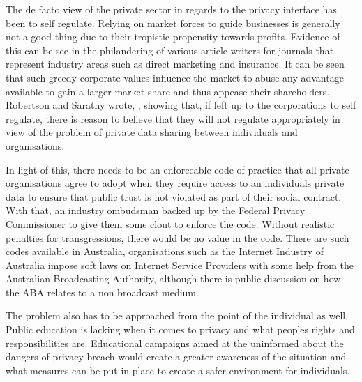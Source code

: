 The de facto view of the private sector in regards to the privacy interface has
been to self regulate. Relying on market forces to guide businesses is
generally not a good thing due to their tropistic propensity towards profits.
Evidence of this can be see in the philandering of various article writers
for journals that represent industry areas such as direct marketing and
insurance. It can be seen that such greedy corporate values influence the
market to abuse any advantage available to gain a larger market share and thus
appease their shareholders. Robertson and Sarathy wrote, ,
showing that, if left up to the corporations to self regulate, there is reason
to believe that they will not regulate appropriately in view of the problem of
private data sharing between individuals and organisations.

In light of this, there needs to be an enforceable code of practice that all
private organisations agree to adopt when they require access to an individuals
private data to ensure that public trust is not violated as part of their
social contract.  With that, an industry ombudsman backed up by the Federal
Privacy Commissioner to give them some clout to enforce the code. Without
realistic penalties for transgressions, there would be no value in the code.
There are such codes available in Australia, organisations such as the Internet
Industry of Australia impose soft laws on Internet Service Providers with some
help from the Australian Broadcasting Authority, although there is public
discussion on how the ABA relates to a non broadcast medium.

The problem also has to be approached from the point of the individual as well.
Public education is lacking when it comes to privacy and what peoples rights
and responsibilities are. Educational campaigns aimed at the uninformed about
the dangers of privacy breach would create a greater awareness of the situation
and what measures can be put in place to create a safer environment for
individuals.

